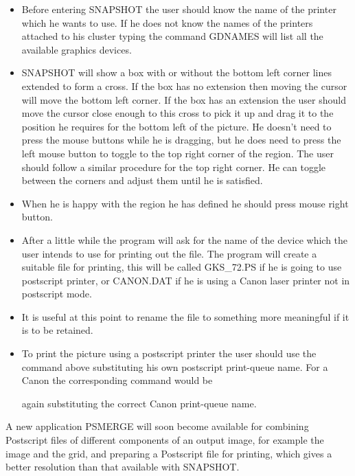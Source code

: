 \documentclass[twoside,11pt]{starlink}
\begin{document}
\begin{itemize}
\item Before entering SNAPSHOT the user should know the name of the printer
which he wants to use. If he does not know the names of the printers attached
to his cluster typing the command GDNAMES will list all the available graphics
devices.
\item SNAPSHOT will show a box with or without the bottom left corner lines
extended to form a cross. If the box has no extension then moving the cursor
will move the bottom left corner. If the box has an extension the user should
move the cursor close enough to this cross to pick it up and drag it to
the position he requires for the bottom left of the picture. He doesn't need
to press the mouse buttons while he is dragging, but he does need to press the
left mouse button to toggle to the top right corner of the
region. The user should follow a similar procedure for the top right corner.
He can toggle between the corners and adjust them until he is satisfied.
\item When he is happy with the region he has defined he should press
mouse right button.
\item After a little while the program will ask for the name of the device
which the user intends to use for printing out the file. The program will
create a suitable file for printing, this will be called GKS\_72.PS if he is
going to use postscript printer, or CANON.DAT if he is using a Canon laser
printer not in postscript mode.
\item It is useful at this point to rename the file to something more
meaningful if it is to be retained.
\item To print the picture using a postscript printer the user should use the
command above substituting his own postscript print-queue name. For a Canon
the corresponding command would be
\begin{small}
\end{small}
again substituting the correct Canon print-queue name.
\end{itemize}

A new application PSMERGE will soon become available for combining Postscript
files of different components of an output image, for example the image and
the grid, and preparing a Postscript file for printing, which gives a better
resolution than that available with SNAPSHOT.
\end{document}
